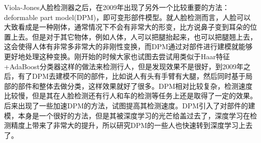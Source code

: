 Viola-Jones人脸检测器之后，在2009年出现了另外一个比较重要的方法：deformable
part model(DPM)\cite{dpm}，即可变形部件模型。就人脸检测而言，人脸可以大致看成是一种刚体，通常情况下不会有非常大的形变，比方说鼻子变到耳朵的位置上去。但是对于其它物体，例如人体，人可以把腿抬起来，也可以把腿翘上去，这会使得人体有非常多非常大的非刚性变换，而DPM通过对部件进行建模就能够更好地处理这种变换。刚开始的时候大家也试图去尝试用类似于Haar特征+AdaBoost分类器这样的做法来检测行人，但是发现效果不是很好，到2009年之后，有了DPM去建模不同的部件，比如说人有头有手臂有大腿，然后同时基于局部的部件和整体去做分类，这样效果就好了很多。DPM相对比较复杂，检测速度比较慢，但是其在人脸检测还有行人和车的检测等任务上还是取得了一定的效果。后来出现了一些加速DPM的方法，试图提高其检测速度。DPM引入了对部件的建模，本身是一个很好的方法，但是其被深度学习的光芒给盖过去了，深度学习在检测精度上带来了非常大的提升，所以研究DPM的一些人也快速转到深度学习上去了。